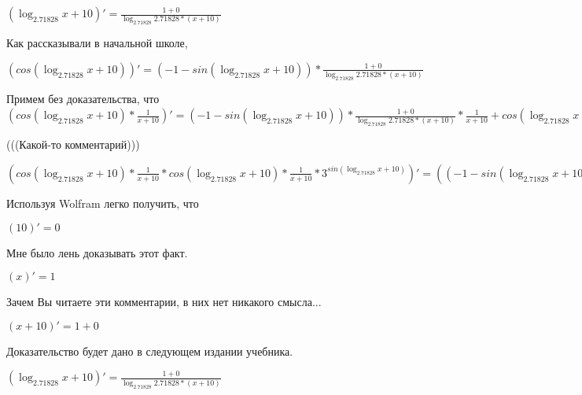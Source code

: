 \documentclass[12pt,a4paper,fleqn]{article}
\theoremstyle{definition}
\begin{document}
$(\log_{ 2.71828 }{ x  +  10 })' = \frac{ 1  +  0 }{\log_{ 2.71828 }{ 2.71828 } * ( x  +  10 )}
$

Как рассказывали в начальной школе,

$(cos(\log_{ 2.71828 }{ x  +  10 }))' = ( -1  - sin(\log_{ 2.71828 }{ x  +  10 })) * \frac{ 1  +  0 }{\log_{ 2.71828 }{ 2.71828 } * ( x  +  10 )}
$

Примем без доказательства, что
$(cos(\log_{ 2.71828 }{ x  +  10 }) * \frac{ 1 }{ x  +  10 }
)' = ( -1  - sin(\log_{ 2.71828 }{ x  +  10 })) * \frac{ 1  +  0 }{\log_{ 2.71828 }{ 2.71828 } * ( x  +  10 )}
 * \frac{ 1 }{ x  +  10 }
 + cos(\log_{ 2.71828 }{ x  +  10 }) * \frac{ 0  * ( x  +  10 ) -  1  * ( 1  +  0 )}{( x  +  10 ) * ( x  +  10 )}
$

(((Какой-то комментарий)))

$(cos(\log_{ 2.71828 }{ x  +  10 }) * \frac{ 1 }{ x  +  10 }
 * cos(\log_{ 2.71828 }{ x  +  10 }) * \frac{ 1 }{ x  +  10 }
 * { 3 }^{sin(\log_{ 2.71828 }{ x  +  10 })})' = (( -1  - sin(\log_{ 2.71828 }{ x  +  10 })) * \frac{ 1  +  0 }{\log_{ 2.71828 }{ 2.71828 } * ( x  +  10 )}
 * \frac{ 1 }{ x  +  10 }
 + cos(\log_{ 2.71828 }{ x  +  10 }) * \frac{ 0  * ( x  +  10 ) -  1  * ( 1  +  0 )}{( x  +  10 ) * ( x  +  10 )}
) * cos(\log_{ 2.71828 }{ x  +  10 }) * \frac{ 1 }{ x  +  10 }
 * { 3 }^{sin(\log_{ 2.71828 }{ x  +  10 })} + cos(\log_{ 2.71828 }{ x  +  10 }) * \frac{ 1 }{ x  +  10 }
 * ((( -1  - sin(\log_{ 2.71828 }{ x  +  10 })) * \frac{ 1  +  0 }{\log_{ 2.71828 }{ 2.71828 } * ( x  +  10 )}
 * \frac{ 1 }{ x  +  10 }
 + cos(\log_{ 2.71828 }{ x  +  10 }) * \frac{ 0  * ( x  +  10 ) -  1  * ( 1  +  0 )}{( x  +  10 ) * ( x  +  10 )}
) * { 3 }^{sin(\log_{ 2.71828 }{ x  +  10 })} + cos(\log_{ 2.71828 }{ x  +  10 }) * \frac{ 1 }{ x  +  10 }
 * \log_{ 2.71828 }{ 3 } * cos(\log_{ 2.71828 }{ x  +  10 }) * \frac{ 1  +  0 }{\log_{ 2.71828 }{ 2.71828 } * ( x  +  10 )}
 * { 3 }^{sin(\log_{ 2.71828 }{ x  +  10 })})$

Используя Wolfram легко получить, что

$( 10 )' =  0 $

Мне было лень доказывать этот факт.

$( x )' =  1 $

Зачем Вы читаете эти комментарии, в них нет никакого смысла...

$( x  +  10 )' =  1  +  0 $

Доказательство будет дано в следующем издании учебника.

$(\log_{ 2.71828 }{ x  +  10 })' = \frac{ 1  +  0 }{\log_{ 2.71828 }{ 2.71828 } * ( x  +  10 )}
$
\end{document}
